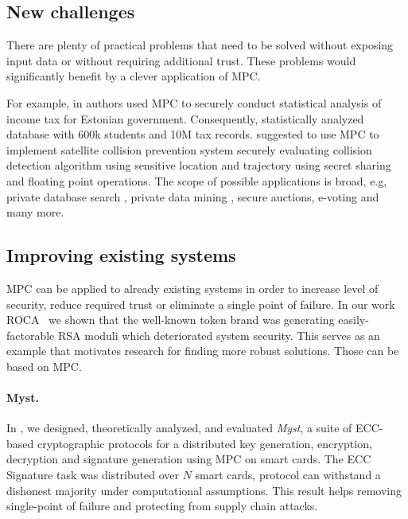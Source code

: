 \documentclass[
  digital, %
  twoside, %
  table,   %
  lof,     %
  lot,     %
]{fithesis3}
\begin{document}
\subsection{New challenges} There are plenty of practical problems that need to be solved without exposing input data or without requiring additional trust. These problems would significantly benefit by a clever application of MPC.

For example, in \cite{BJSV15} authors used MPC to securely conduct statistical analysis of income tax for Estonian government. Consequently, \cite{BKKRST16} statistically analyzed database with 600k students and 10M tax records. \cite{KW15} suggested to use MPC to implement satellite collision prevention system securely evaluating collision detection algorithm using sensitive location and trajectory using secret sharing and floating point operations. The scope of possible applications is broad, e.g,  private database search \cite{Bertino2005, Naor:1999:PPA:336992.337028}, private data mining \cite{Aldeen2015}, secure auctions, e-voting and many more.

\subsection{Improving existing systems}
MPC can be applied to already existing systems in order to increase level of security, reduce required trust or eliminate a single point of failure.
In our work ROCA~\cite{2017-ccs-nemec} we shown that the well-known token brand was generating easily-factorable RSA moduli which deteriorated system security. This serves as an example that motivates research for finding more robust solutions. Those can be based on MPC.
    
\paragraph{Myst.} In \cite{2017-ccs-mavroudis}, we designed, theoretically analyzed, and evaluated \emph{Myst}, a suite of ECC-based cryptographic protocols for a distributed key generation, encryption, decryption and signature generation using MPC on smart cards.
The ECC Signature task was distributed over $N$ smart cards, protocol can withstand a dishonest majority under computational assumptions. This result helps removing single-point of failure and protecting from supply chain attacks.
    
\end{document}

